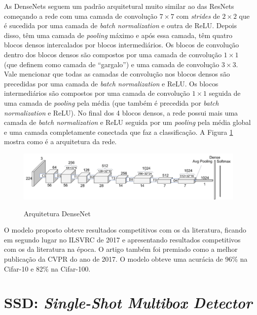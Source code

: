 As \ac{DenseNet}s seguem um padrão arquitetural muito similar ao das \ac{ResNet}s começando a rede com uma camada de convolução $7\times7$ com \textit{strides} de $2\times2$ que é sucedida por uma camada de \textit{batch normalization} e outra de \ac{ReLU}. Depois disso, têm uma camada de \textit{pooling} máximo e após essa camada, têm quatro blocos densos intercalados por blocos intermediários. Os blocos de convolução dentro dos blocos densos são compostos por uma camada de convolução $1\times1$ (que  definem como camada de ``gargalo'') e uma camada de convolução $3\times3$. Vale mencionar que todas as camadas de convolução nos blocos densos são precedidas por uma camada de \textit{batch normalization} e \ac{ReLU}. Os blocos intermediários são compostos por uma camada de convolução $1\times1$ seguida de uma camada de \textit{pooling} pela média (que também é precedida por \textit{batch normalization} e \ac{ReLU}). No final dos 4 blocos densos, a rede possui mais uma camada de \textit{batch normalization} e \ac{ReLU} seguida por um \textit{pooling} pela média global e uma camada completamente conectada que faz a classificação. A Figura \ref{fig:archdensenet} mostra como é a arquitetura da rede.

\begin{figure}[H]
	\setlength{\abovecaptionskip}{0pt}
	\setlength{\belowcaptionskip}{0pt}
	\caption[Arquitetura DenseNet]{Arquitetura DenseNet}
	\centering
	\includegraphics[width=.7\textwidth]{imagem/0x_densenet_arch.png}
	\captionsetup{justification=centering}
	\label{fig:archdensenet}
\end{figure}

O modelo proposto obteve resultados competitivos com os da literatura, ficando em segundo lugar no \ac{ILSVRC} de 2017 e apresentando resultados competitivos com os da literatura na época. O artigo também foi premiado como a melhor publicação da \ac{CVPR} do ano de 2017. O modelo obteve uma acurácia de 96\% na Cifar-10 e 82\% na Cifar-100.

\section{SSD: \textit{Single-Shot Multibox Detector}}
\label{secao:3:2}

